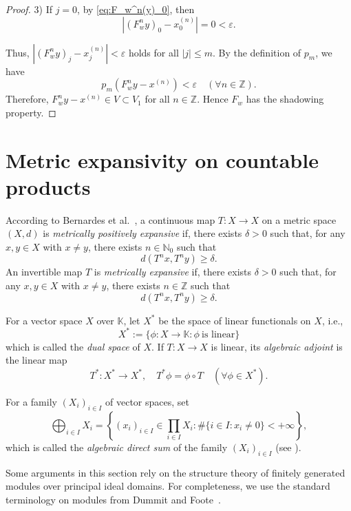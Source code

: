 \documentclass[11pt]{amsart}
\theoremstyle{definition}
\theoremstyle{remark}
\theoremstyle{plain}
\begin{document}
\begin{proof}
3) If \(j=0\), by \eqref{eq:F_w^n(y)_0}, then
\[
|(F_w^n y)_0-x^{(n)}_0|=0<\varepsilon.
\]

Thus, $|(F_w^n y)_j-x^{(n)}_j|<\varepsilon$ holds for all \(|j|\le m\).
By the definition of \(p_m\), we have
\[
p_m(F_w^n y-x^{(n)})<\varepsilon
\quad(\forall n\in\mathbb{Z}).
\]
Therefore, \(F_w^n y-x^{(n)}\in V\subset V_1\) for all \(n\in\mathbb{Z}\).
Hence \(F_w\) has the shadowing property.
\end{proof}

\section{Metric expansivity on countable products}
\label{Sec:3}
According to Bernardes et al.~\cite{BCDFP}, a continuous map \(T:X\to X\) on a
metric space \((X,d)\) is \textit{metrically positively expansive} if, there exists
\(\delta>0\) such that, for any \(x, y\in X\) with \(x\ne y\),
there exists \(n\in\mathbb{N}_0\) such that
\[
d(T^n x,T^n y)\ge\delta.
\]
An invertible map \(T\) is \textit{metrically expansive} if, there exists \(\delta>0\)
such that, for any \(x, y\in X\) with \(x\ne y\), there exists \(n\in\mathbb{Z}\)
such that
\[
d(T^n x,T^n y)\ge\delta.
\]


For a vector space \(X\) over \(\mathbb{K}\), let \(X^*\) be the space
of linear functionals on \(X\), i.e.,
\[
X^*:=\{\phi:X\to\mathbb{K}:\phi\ \text{is linear}\}
\]
which is called the \textit{dual space} of \(X\).
If \(T:X\to X\) is linear, its \textit{algebraic adjoint} is the linear map
\[
T^*:X^*\to X^*,\quad T^*\phi=\phi\circ T
\quad(\forall \phi\in X^*).
\]

For a family \((X_i)_{i\in I}\) of vector spaces, set
\[
\bigoplus_{i\in I}X_i=
\left\{(x_i)_{i\in I}\in\prod_{i\in I}X_i:
\#\{i\in I:x_i\ne0\}<+\infty\right\},
\]
which is called the \textit{algebraic direct sum} of the family \((X_i)_{i\in I}\)
(see \cite[Sec.~10.3, Exercise~20]{DF}).

Some arguments in this section rely on the structure theory
of finitely generated modules over principal ideal domains.
For completeness, we use the standard terminology on modules from Dummit and
Foote~\cite[Chapters~10 and 12]{DF}.
\end{document}
